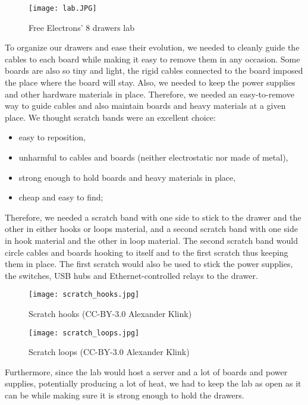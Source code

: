 \begin{figure}
  \centering
  \texttt{[image: lab.JPG]}
  \caption{Free Electrons' 8 drawers lab}
\end{figure}

To organize our drawers and ease their evolution, we needed to cleanly guide the cables to each board while making it easy to remove them in any occasion. Some boards are also so tiny and light, the rigid cables connected to the board imposed the place where the board will stay. Also, we needed to keep the power supplies and other hardware materials in place. Therefore, we needed an easy-to-remove way to guide cables and also maintain boards and heavy materials at a given place. We thought scratch bands were an excellent choice:

\begin{itemize}
  \item easy to reposition,
  \item unharmful to cables and boards (neither electrostatic nor made of metal),
  \item strong enough to hold boards and heavy materials in place,
  \item cheap and easy to find;
\end{itemize}

Therefore, we needed a scratch band with one side to stick to the drawer and the other in either hooks or loops material, and a second scratch band with one side in hook material and the other in loop material. The second scratch band would circle cables and boards hooking to itself and to the first scratch thus keeping them in place. The first scratch would also be used to stick the power supplies, the switches, USB hubs and Ethernet-controlled relays to the drawer.

\begin{figure}[H]
  \centering
  \begin{minipage}[b]{0.45\textwidth}
    \texttt{[image: scratch\_hooks.jpg]}
    \caption{Scratch hooks (CC-BY-3.0 Alexander Klink)}
  \end{minipage}
  \hfill
  \begin{minipage}[b]{0.45\textwidth}
    \texttt{[image: scratch\_loops.jpg]}
    \caption{Scratch loops (CC-BY-3.0 Alexander Klink)}
  \end{minipage}
\end{figure}

Furthermore, since the lab would host a server and a lot of boards and power supplies, potentially producing a lot of heat, we had to keep the lab as open as it can be while making sure it is strong enough to hold the drawers.

